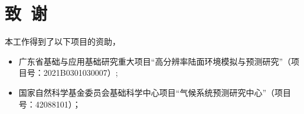 
\section*{致~谢}

本工作得到了以下项目的资助，

\begin{itemize}[itemsep=1pt,topsep=0pt,parsep=0pt]
    \item 广东省基础与应用基础研究重大项目“高分辨率陆面环境模拟与预测研究”（项目号：2021B0301030007）;
    \item 国家自然科学基金委员会基础科学中心项目“气候系统预测研究中心”（项目号：42088101）；

    
    
\end{itemize}